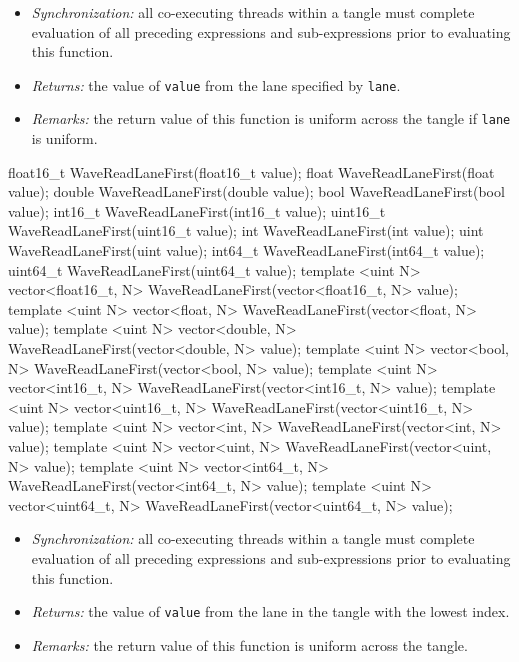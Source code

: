 \begin{itemize}
  \item \textit{Synchronization:} all co-executing threads within a \gls{tangle}
  must complete evaluation of all preceding expressions and sub-expressions
  prior to evaluating this function.
  \item \textit{Returns:} the value of \texttt{value} from the \gls{lane}
  specified by \texttt{lane}.
  \item \textit{Remarks:} the return value of this function is uniform across
  the \gls{tangle} if \texttt{lane} is uniform.
\end{itemize}

\begin{HLSL}
float16_t WaveReadLaneFirst(float16_t value);
float WaveReadLaneFirst(float value);
double WaveReadLaneFirst(double value);
bool WaveReadLaneFirst(bool value);
int16_t WaveReadLaneFirst(int16_t value);
uint16_t WaveReadLaneFirst(uint16_t value);
int WaveReadLaneFirst(int value);
uint WaveReadLaneFirst(uint value);
int64_t WaveReadLaneFirst(int64_t value);
uint64_t WaveReadLaneFirst(uint64_t value);
template <uint N> vector<float16_t, N> WaveReadLaneFirst(vector<float16_t, N> value);
template <uint N> vector<float, N> WaveReadLaneFirst(vector<float, N> value);
template <uint N> vector<double, N> WaveReadLaneFirst(vector<double, N> value);
template <uint N> vector<bool, N> WaveReadLaneFirst(vector<bool, N> value);
template <uint N> vector<int16_t, N> WaveReadLaneFirst(vector<int16_t, N> value);
template <uint N> vector<uint16_t, N> WaveReadLaneFirst(vector<uint16_t, N> value);
template <uint N> vector<int, N> WaveReadLaneFirst(vector<int, N> value);
template <uint N> vector<uint, N> WaveReadLaneFirst(vector<uint, N> value);
template <uint N> vector<int64_t, N> WaveReadLaneFirst(vector<int64_t, N> value);
template <uint N> vector<uint64_t, N> WaveReadLaneFirst(vector<uint64_t, N> value);
\end{HLSL}

\begin{itemize}
  \item \textit{Synchronization:} all co-executing threads within a \gls{tangle}
  must complete evaluation of all preceding expressions and sub-expressions
  prior to evaluating this function.
  \item \textit{Returns:} the value of \texttt{value} from the lane in the
  \gls{tangle} with the lowest index.
  \item \textit{Remarks:} the return value of this function is uniform across
  the \gls{tangle}.
\end{itemize}

